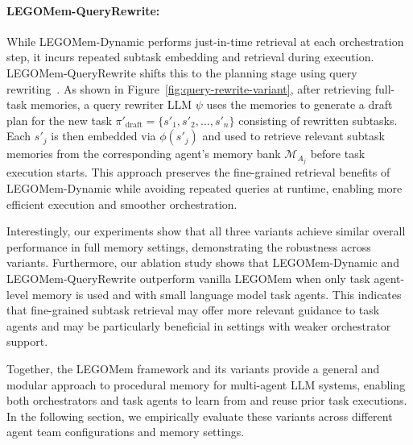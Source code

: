 \documentclass[sigconf]{aamas}
\newcommand{\legomem}{LEGOMem}
\newcommand{\dynalegomem}{LEGOMem-Dynamic}
\newcommand{\queryrewritelegomem}{LEGOMem-QueryRewrite}
\begin{document}
\paragraph{\queryrewritelegomem{}:}
While \dynalegomem{} performs just-in-time retrieval at each orchestration step, it incurs repeated subtask embedding and retrieval during execution. \queryrewritelegomem{} shifts this to the planning stage using query rewriting~\cite{ma2023query, lidmqr}. As shown in Figure~\ref{fig:query-rewrite-variant}, after retrieving full-task memories, a query rewriter LLM $\psi$ uses the memories to generate a draft plan for the new task $\pi'_{\text{draft}} = \{s'_1, s'_2, \dots, s'_n\}$ consisting of rewritten subtasks. Each $s'_j$ is then embedded via $\phi(s'_j)$ and used to retrieve relevant subtask memories from the corresponding agent’s memory bank $\mathcal{M}_{A_j}$ before task execution starts. This approach preserves the fine-grained retrieval benefits of \dynalegomem{} while avoiding repeated queries at runtime, enabling more efficient execution and smoother orchestration.

Interestingly, our experiments show that all three variants achieve similar overall performance in full memory settings, demonstrating the robustness across variants. Furthermore, our ablation study shows that \dynalegomem{} and \queryrewritelegomem{} outperform vanilla \legomem{} when only task agent-level memory is used and with small language model task agents. This indicates that fine-grained subtask retrieval may offer more relevant guidance to task agents and may be particularly beneficial in settings with weaker orchestrator support.

Together, the \legomem{} framework and its variants provide a general and modular approach to procedural memory for multi-agent LLM systems, enabling both orchestrators and task agents to learn from and reuse prior task executions. In the following section, we empirically evaluate these variants across different agent team configurations and memory settings.
\end{document}
